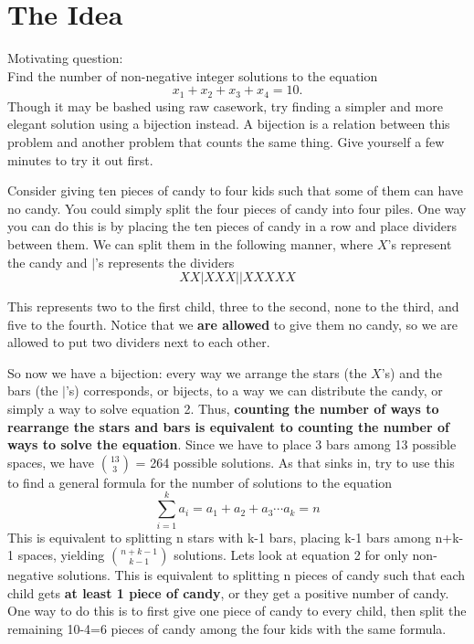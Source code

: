 \documentclass[11pt]{article}
\begin{document}
    \section{The Idea}
    Motivating question: \\
    Find the number of non-negative integer solutions to the equation
    \begin{equation}
        x_1+x_2+x_3+x_4=10.
    \end{equation}
    Though it may be bashed using raw casework, try finding a simpler and more elegant solution using a bijection instead. A bijection is a relation between this problem and another problem that counts the same thing.  Give yourself a few minutes to try it out first. \par
    Consider giving ten pieces of candy to four kids such that some of them can have no candy. You could simply split the four pieces of candy into four piles. One way you can do this is by placing the ten pieces of candy in a row and place dividers between them. We can split them in the following manner, where $X$'s represent the candy and $|$'s represents the dividers
    \begin{equation}
        XX|XXX||XXXXX
    \end{equation} \par
    This represents two to the first child, three to the second, none to the third, and five to the fourth. Notice that we \textbf{are allowed} to give them no candy, so we are allowed to put two dividers next to each other. \par
    So now we have a bijection: every way we arrange the stars (the $X$'s) and the bars (the $|$'s) corresponds, or bijects, to a way we can distribute the candy, or simply a way to solve equation 2. Thus, \textbf{counting the number of ways to rearrange the stars and bars is equivalent to counting the number of ways to solve the equation}. Since we have to place 3 bars among 13 possible spaces, we have $\binom{13}{3}$ = 264 possible solutions.
    As that sinks in, try to use this to find a general formula for the number of solutions to the equation
    \begin{equation}
        \sum_{i=1}^ka_i=a_1+a_2+a_3\cdots a_k=n
    \end{equation}
    This is equivalent to splitting n stars with k-1 bars, placing k-1 bars among n+k-1 spaces, yielding $\binom{n+k-1}{k-1}$ solutions. Lets look at equation 2 for only non-negative solutions. This is equivalent to splitting n pieces of candy such that each child gets \textbf{at least 1 piece of candy}, or they get a positive number of candy. One way to do this is to first give one piece of candy to every child, then split the remaining 10-4=6 pieces of candy among the four kids with the same formula. \par
\end{document}
